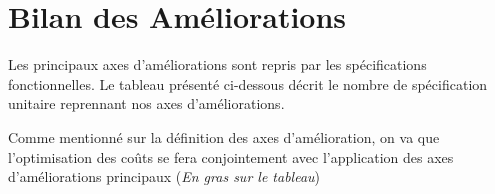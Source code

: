 \section{Bilan des Améliorations}

Les principaux axes d'améliorations sont repris par les spécifications fonctionnelles. 
Le tableau présenté ci-dessous décrit le nombre de spécification unitaire reprennant nos axes d'améliorations. 

Comme mentionné sur la définition des axes d'amélioration, on va que l'optimisation des coûts se fera conjointement avec l'application des axes d'améliorations principaux (\textit{En gras sur le tableau})


